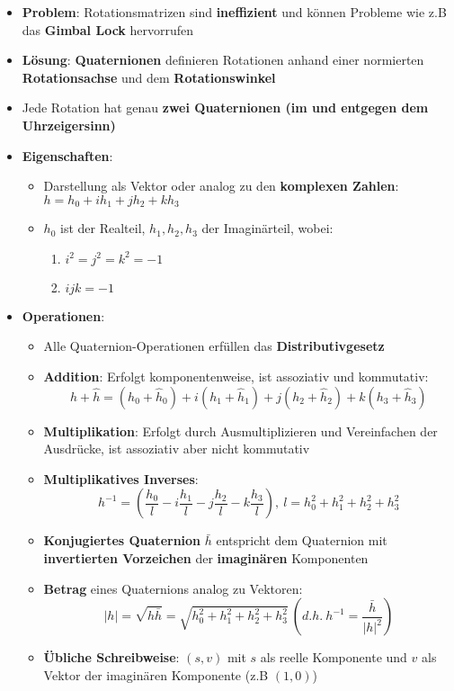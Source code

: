 \begin{itemize}
	\item \textbf{Problem}: Rotationsmatrizen sind \textbf{ineffizient} und können Probleme wie z.B das \textbf{Gimbal Lock} hervorrufen
	\item \textbf{Lösung}: \textbf{Quaternionen} definieren Rotationen anhand einer normierten \textbf{Rotationsachse} und dem \textbf{Rotationswinkel}
	\item Jede Rotation hat genau \textbf{zwei Quaternionen (im und entgegen dem Uhrzeigersinn)}
	\item \textbf{Eigenschaften}:
	\begin{itemize}
		\item Darstellung als Vektor oder analog zu den \textbf{komplexen Zahlen}: $h = h_0 + ih_1 + jh_2 + kh_3$
		\item $h_0$ ist der Realteil, $h_1, h_2, h_3$ der Imaginärteil, wobei:
		\begin{enumerate}
			\item $i^2 = j^2 = k^2 = -1$
			\item $ijk = -1$
		\end{enumerate}
	\end{itemize}
	\newpage
	\item \textbf{Operationen}:
	\begin{itemize}
		\item Alle Quaternion-Operationen erfüllen das \textbf{Distributivgesetz}
		\item \textbf{Addition}: Erfolgt komponentenweise, ist assoziativ und kommutativ:
		$$h + \hat{h} = (h_0 + \hat{h}_0) + i(h_1 + \hat{h}_1) + j(h_2 + \hat{h}_2) + k(h_3 + \hat{h}_3)$$
		\item \textbf{Multiplikation}: Erfolgt durch Ausmultiplizieren und Vereinfachen der Ausdrücke, ist assoziativ aber nicht kommutativ
		\item \textbf{Multiplikatives Inverses}:
		$$h^{-1} = (\frac{h_0}{l} - i\frac{h_1}{l} - j\frac{h_2}{l} - k\frac{h_3}{l}),\ l = h_0^2 + h_1^2 + h_2^2 + h_3^2$$
		\item \textbf{Konjugiertes Quaternion} $\bar{h}$ entspricht dem Quaternion mit \textbf{invertierten Vorzeichen} der \textbf{imaginären} Komponenten
		\item \textbf{Betrag} eines Quaternions analog zu Vektoren: $$|h| = \sqrt{h\bar{h}} = \sqrt{h_0^2 + h_1^2 + h_2^2 + h_3^2}\ (d.h.\ h^{-1} = \frac{\bar{h}}{|h|^2})$$
		\item \textbf{Übliche Schreibweise}: $(s, v)$ mit $s$ als reelle Komponente und $v$ als Vektor der imaginären Komponente (z.B $(1, 0)$)

\end{itemize}
\end{itemize}
